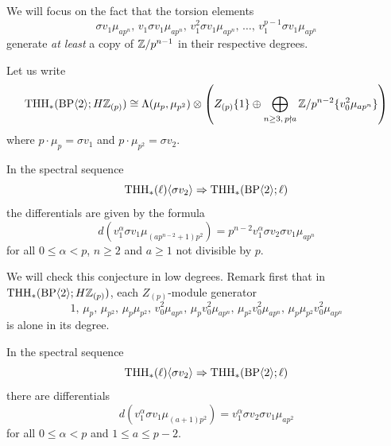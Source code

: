 We will focus on the fact that the torsion elements
\begin{equation}
  \sigma v_1 \mu_{ap^n},\, v_1 \sigma v_1 \mu_{ap^n},\, v_1^2 \sigma v_1 \mu_{ap^n},\, \dots,\, v_1^{p-1} \sigma v_1 \mu_{ap^n}
\end{equation}
generate \emph{at least} a copy of $\mathbb{Z}/p^{n-1}$ in their respective degrees.

Let us write
\begin{equation}
  \operatorname{THH}_*(\mathrm{BP} \langle 2 \rangle; H \mathbb{Z}_{(p)}) \cong \Lambda(\mu_p, \mu_{p^2}) \otimes \left(Z_{(p)}\{1\} \oplus \bigoplus_{n \geq 3,\, p \nmid a} \mathbb{Z} / p^{n-2} \{v_0^2 \mu_{ap^n} \}\right)
\end{equation}
where $p \cdot \mu_p = \sigma v_1$ and $p \cdot \mu_{p^2} = \sigma v_2$.


\begin{conjecture}
  In the spectral sequence
  \begin{equation}
    \operatorname{THH}_*(\ell)\langle \sigma v_2 \rangle \Rightarrow \operatorname{THH}_* (\mathrm{BP} \langle 2 \rangle ; \ell)
  \end{equation}
  the differentials are given by the formula
  \begin{equation}
    d(v_1^\alpha \sigma v_1 \mu_{(a p^{n-2} + 1)p^2}) = p^{n-2} v_1^\alpha \sigma v_2 \sigma v_1 \mu_{a p^n}
  \end{equation}
  for all $0 \leq \alpha < p$, $n \geq 2$ and $a \geq 1$ not divisible by $p$. 
\end{conjecture}

We will check this conjecture in low degrees. Remark first that in $\operatorname{THH}_*(\mathrm{BP} \langle 2 \rangle; H \mathbb{Z}_{(p)})$, each $Z_{(p)}$-module generator
\begin{equation}
  1,\, \mu_p,\, \mu_{p^2},\, \mu_p \mu_{p^2},\, v_0^2 \mu_{ap^n},\, \mu_pv_0^2 \mu_{ap^n},\, \mu_{p^2}v_0^2 \mu_{ap^n},\, \mu_p \mu_{p^2}v_0^2 \mu_{ap^n}
\end{equation}
is alone in its degree.

\begin{proposition}
  In the spectral sequence
  \begin{equation}
    \operatorname{THH}_*(\ell)\langle \sigma v_2 \rangle \Rightarrow \operatorname{THH}_* (\mathrm{BP} \langle 2 \rangle ; \ell)
  \end{equation}
  there are differentials
  \begin{equation}
    d(v_1^\alpha \sigma v_1 \mu_{(a + 1)p^2}) = v_1^\alpha \sigma v_2 \sigma v_1 \mu_{a p^2}
  \end{equation}
  for all $0 \leq \alpha < p$ and $1 \leq a \leq p - 2$.
\end{proposition}

